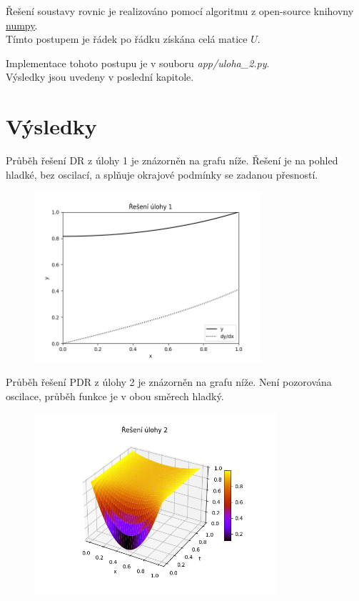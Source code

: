 \documentclass[a4paper,12pt]{article}
\begin{document}
Řešení soustavy rovnic je realizováno pomocí algoritmu z open-source knihovny \textcolor{blue}{\underline{\href{https://numpy.org/}{numpy}}}.\\
Tímto postupem je řádek po řádku získána celá matice $U$.

Implementace tohoto postupu je v souboru \textit{app/uloha\_2.py}. \\
Výsledky jsou uvedeny v poslední kapitole.



\newpage
\section*{Výsledky}
Průběh řešení DR z úlohy 1 je znázorněn na grafu níže.
Řešení je na pohled hladké, bez oscilací, a splňuje okrajové podmínky se zadanou přesností.
\begin{figure}[H]
\begin{center}
	\includegraphics[width=0.75\textwidth]{uloha_1.png}
\end{center}
\end{figure}

Průběh řešení PDR z úlohy 2 je znázorněn na grafu níže.
Není pozorována oscilace, průběh funkce je v obou směrech hladký.
\begin{figure}[H]
\begin{center}
	\includegraphics[width=0.8\textwidth]{uloha_2.png}
\end{center}
\end{figure}
\end{document}
